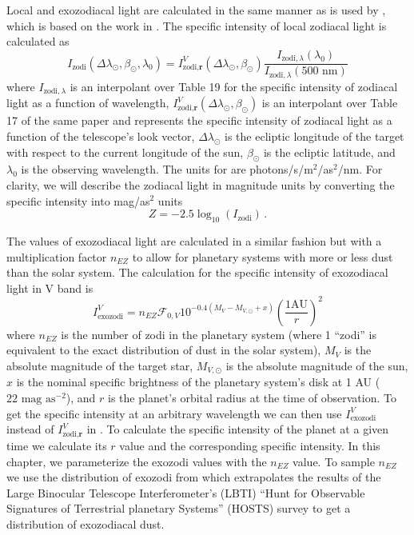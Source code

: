 Local and exozodiacal light are calculated in the same manner as is used by
, which is based on the work in \citet{leinert1997Reference1998,
starkMaximizingExoEarthCandidate2014,starkLowerLimitsAperture2015,
keithlyOptimalScheduling2020}. The specific intensity of local zodiacal
light is calculated as
\begin{equation}
  I_\textrm{zodi}(\Delta \lambda_\odot, \beta_\odot, \lambda_0) = 
  I_{\textrm{zodi}, \textbf{r}}^V(\Delta \lambda_\odot, \beta_\odot) 
\frac{I_{\textrm{zodi}, \lambda} (\lambda_0)}{I_{\textrm{zodi}, \lambda}(\textrm{500 nm})}
  \label{eq:local_zodi}
\end{equation}
where $I_{\textrm{zodi}, \lambda}$ is an interpolant over
\citet{leinert1997Reference1998} Table 19 for the specific intensity of
zodiacal light as a function of wavelength, $I_{\textrm{zodi},
\textbf{r}}^V(\Delta \lambda_\odot, \beta_\odot)$ is an interpolant over Table 17 of the same
paper and represents the specific intensity of zodiacal light as a function of
the telescope's look vector, $\Delta \lambda_\odot$ is the ecliptic
longitude of the target with respect to the current longitude of the sun,
$\beta_\odot$ is the ecliptic latitude, and $\lambda_0$ is the observing
wavelength. The units for  are photons/s/m$^2$/as$^2$/nm.
For clarity, we will describe the zodiacal light in magnitude units by
converting the specific intensity into mag/as$^2$ units
\begin{equation}
  Z = -2.5 \log_{10}(I_\textrm{zodi}) \,.
  \label{eq:zodi_mag}
\end{equation}

The values of exozodiacal light are calculated in a
similar fashion but with a multiplication factor $n_{EZ}$ to allow for
planetary systems with more or less dust than the solar system. The calculation
for the specific intensity of exozodiacal light in V band is
\begin{equation}
  I_\textrm{exozodi}^V = n_{EZ} \mathcal{F}_{0,V}10^{-0.4(M_V-M_{V,\odot}+x)}\left( \frac{1 \textrm{AU}}{r}\right)^2
  \label{eq:exozodi}
\end{equation}
where $n_{EZ}$ is the number of zodi in the planetary system (where 1 ``zodi'' is
equivalent to the exact distribution of dust in the solar system), $M_V$ is the
absolute magnitude of the target star, $M_{V,\odot}$ is the absolute magnitude
of the sun, $x$ is the nominal specific brightness of the planetary system's
disk at 1 AU ($22\textrm{ mag }\textrm{as}^{-2}$), and $r$ is the planet's orbital radius at the time of
observation. To get the specific intensity at an arbitrary wavelength we can
then use $I_\textrm{exozodi}^V$ instead of $I_{\textrm{zodi}, \textbf{r}}^V$ in
. To calculate the specific intensity of the planet at a
given time we calculate its $r$ value and the corresponding specific intensity.
In this chapter, we parameterize the exozodi values with the $n_{EZ}$ value. To
sample $n_{EZ}$ we use the distribution of exozodi from
\citet{ertelHOSTSSurvey2020} which extrapolates the results of the Large
Binocular Telescope Interferometer's (LBTI) ``Hunt for Observable Signatures of
Terrestrial planetary Systems'' (HOSTS) survey to get a distribution of
exozodiacal dust.


